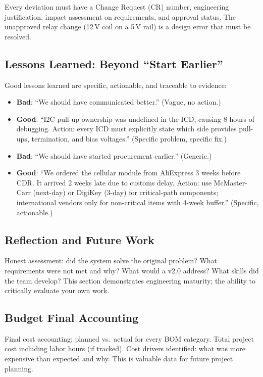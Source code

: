 Every deviation must have a Change Request (CR) number, engineering justification, impact assessment on requirements, and approval status. The unapproved relay change (12\,V coil on a 5\,V rail) is a design error that must be resolved.

\subsection{Lessons Learned: Beyond ``Start Earlier''}
Good lessons learned are specific, actionable, and traceable to evidence:
\begin{itemize}[nosep,leftmargin=1.5em]
\item \textbf{Bad}: ``We should have communicated better.'' (Vague, no action.)
\item \textbf{Good}: ``I2C pull-up ownership was undefined in the ICD, causing 8 hours of debugging. Action: every ICD must explicitly state which side provides pull-ups, termination, and bias voltages.'' (Specific problem, specific fix.)
\item \textbf{Bad}: ``We should have started procurement earlier.'' (Generic.)
\item \textbf{Good}: ``We ordered the cellular module from AliExpress 3 weeks before CDR. It arrived 2 weeks late due to customs delay. Action: use McMaster-Carr (next-day) or DigiKey (3-day) for critical-path components; international vendors only for non-critical items with 4-week buffer.'' (Specific, actionable.)
\end{itemize}

\subsection{Reflection and Future Work}
Honest assessment: did the system solve the original problem? What requirements were not met and why? What would a v2.0 address? What skills did the team develop? This section demonstrates engineering maturity; the ability to critically evaluate your own work.

\subsection{Budget Final Accounting}
Final cost accounting: planned vs.\ actual for every BOM category. Total project cost including labor hours (if tracked). Cost drivers identified: what was more expensive than expected and why. This is valuable data for future project planning.

